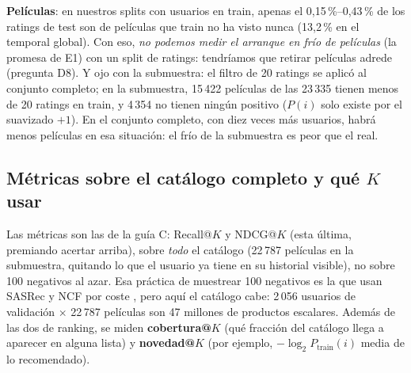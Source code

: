 \documentclass[a4paper,11pt]{article}
\begin{document}
\textbf{Películas}: en nuestros splits con usuarios en train, apenas el 0,15\,\%--0,43\,\% de los ratings de test son de películas
que train no ha visto nunca (13,2\,\% en el temporal global). Con eso, \emph{no podemos medir el arranque en frío de películas}
(la promesa de E1) con un split de ratings: tendríamos que retirar películas adrede (pregunta D8). Y ojo con la submuestra: el
filtro de 20 ratings se aplicó al conjunto completo; en la submuestra, 15\,422 películas de las 23\,335 tienen menos de 20
ratings en train, y 4\,354 no tienen ningún positivo ($P(i)$ solo existe por el suavizado $+1$). En el conjunto completo, con
diez veces más usuarios, habrá menos películas en esa situación: el frío de la submuestra es peor que el real.

\subsection{Métricas sobre el catálogo completo y qué $K$ usar}
Las métricas son las de la guía C: Recall@$K$ y NDCG@$K$ \cite{liang2018} (esta última, premiando acertar arriba), sobre
\emph{todo} el catálogo (22\,787 películas en la submuestra, quitando lo que el usuario ya tiene en su historial visible),
no sobre 100 negativos al azar. Esa práctica de muestrear 100 negativos es la que usan SASRec y NCF por coste
\cite{kang2018,he2017}, pero aquí el catálogo cabe: 2\,056 usuarios de validación $\times$ 22\,787 películas son 47 millones
de productos escalares. Además de las dos de ranking, se miden \textbf{cobertura@$K$} (qué fracción del catálogo llega a
aparecer en alguna lista) y \textbf{novedad@$K$} (por ejemplo, $-\log_2 P_{\text{train}}(i)$ media de lo recomendado).
\end{document}

